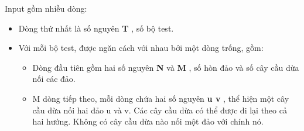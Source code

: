 Input gồm nhiều dòng:  
\begin{itemize}
	\item     Dòng thứ nhất là số nguyên    \textbf{     T    }    , số bộ test.   
	\item     Với mỗi bộ test, được ngăn cách với nhau bởi một dòng trống, gồm:    
\begin{itemize}
	\item       Dòng đầu tiên gồm hai số nguyên      \textbf{       N      }      và      \textbf{       M      }      , số hòn đảo và số cây cầu dừa nối các đảo.     
	\item       M dòng tiếp theo, mỗi dòng chứa hai số nguyên      \textbf{       u v      }      , thể hiện một cây cầu dừa nối hai đảo u và v. Các cây cầu dừa có thể được đi lại theo cả hai hướng. Không có cây cầu dừa nào nối một đảo với chính nó.     
\end{itemize}
\end{itemize}